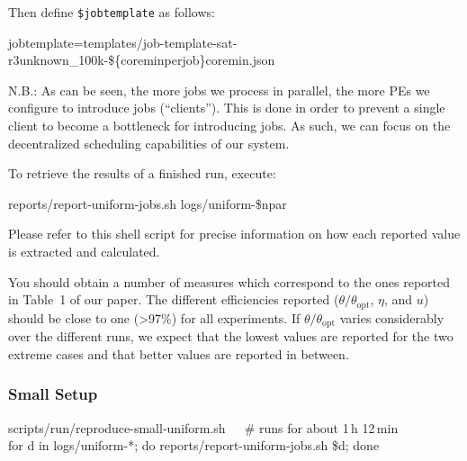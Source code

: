 \documentclass[runningheads]{article}
\numberwithin{dummy}{subsection}
\begin{document}
\vspace{0.4cm}

Then define \texttt{\$jobtemplate} as follows:

\begin{ttfenv}
jobtemplate=templates/job-template-sat-r3unknown\_100k-\$\{coreminperjob\}coremin.json
\end{ttfenv}

N.B.: As can be seen, the more jobs we process in parallel, the more PEs we configure to introduce jobs (``clients'').
This is done in order to prevent a single client to become a bottleneck for introducing jobs.
As such, we can focus on the decentralized scheduling capabilities of our system.

To retrieve the results of a finished run, execute:

\begin{ttfenv}
reports/report-uniform-jobs.sh logs/uniform-\$npar
\end{ttfenv}

Please refer to this shell script for precise information on how each reported value is extracted and calculated.

You should obtain a number of measures which correspond to the ones reported in Table~1 of our paper.
The different efficiencies reported ($\theta/\theta_{\text{opt}}$, $\eta$, and $u$) should be close to one (>97\%) for all experiments.
If $\theta/\theta_{\text{opt}}$ varies considerably over the different runs, we expect that the lowest values are reported for the two extreme cases and that better values are reported in between.

\subsubsection{Small Setup}

\begin{tcolorbox}[
  colback=Magenta!5!white,
  colframe=Magenta!75!black,
  title={\centering In a Nutshell: Commands for Small Setup (Section~\ref{sec:small-setup})}]
\begin{ttfenvcompact}
scripts/run/reproduce-small-uniform.sh\ \ \ \# runs for about 1\,h 12\,min \\
for d in logs/uniform-*; do reports/report-uniform-jobs.sh \$d; done
\end{ttfenvcompact}
\end{tcolorbox}
\end{document}

